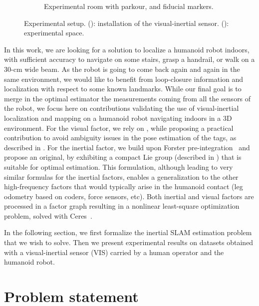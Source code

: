 \begin{figure}[h]
\begin{subfigure}{0.546\textwidth}
        \caption{Experimental room with parkour,  and fiducial markers.}
    \end{subfigure}
    \label{fig:bauzil}
    \caption{Experimental setup. (): installation of the visual-inertial sensor. (): experimental space.}
    \label{fig:HRP2}
\end{figure}

In this work, we are looking for a solution to localize a humanoid robot indoors, with sufficient accuracy to navigate on some stairs, grasp a handrail, or 
walk on a 30-cm wide beam. 
As the robot is going to come back again and again in the same environment, we would like to benefit from loop-closure information and localization with 
respect to some known landmarks. 
While our final goal is to merge in the optimal estimator the measurements coming from all the sensors of the robot, we focus here on contributions 
validating the use of visual-inertial localization and mapping on a humanoid robot navigating indoors in a 3D environment.
For the visual factor, we rely on \apriltags \cite{wang2016iros}, while proposing a practical contribution to avoid ambiguity 
issues in the pose estimation of the tags, as described in . 
For the inertial factor, we build upon Forster pre-integration~\cite{forster2017-TRO} and propose an original,%
by exhibiting a compact Lie group (described in ) that is suitable for optimal estimation. 
This formulation, although leading to very similar formulas %
for the inertial factors, enables a generalization to the other high-frequency factors 
that would typically arise in the humanoid contact (leg odometry based on coders, force sensors, etc).
Both inertial and visual factors are processed in a factor graph resulting in a nonlinear least-square optimization problem, solved with Ceres~\cite{ceres-solver}.

In the following section, we first formalize the inertial SLAM estimation problem that we wish to solve. Then we present experimental results on datasets obtained
with a visual-inertial sensor (VIS) carried by a human operator and the  humanoid robot. 



\section{Problem statement}

